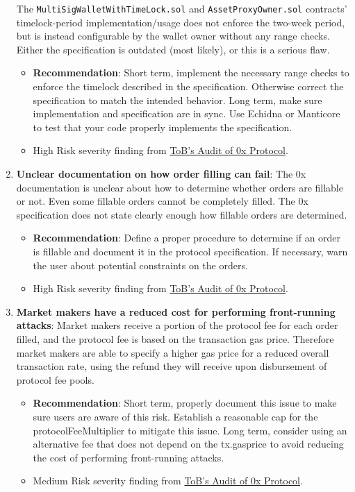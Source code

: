 \begin{enumerate}
The \verb|MultiSigWalletWithTimeLock.sol| and \verb|AssetProxyOwner.sol| contracts' timelock-period implementation/usage does not enforce the two-week period, but is instead configurable by the wallet owner without any range checks. Either the specification is outdated (most likely), or this is a serious flaw.
	\begin{itemize}
	\item\textbf{Recommendation}: Short term, implement the necessary range checks to enforce the timelock described in the specification. Otherwise correct the specification to match the intended behavior. Long term, make sure implementation and specification are in sync. Use Echidna or Manticore to test that your code properly implements the specification.
	\item High Risk severity finding from \href{https://github.com/trailofbits/publications/blob/master/reviews/0x-protocol.pdf}{ToB’s Audit of 0x Protocol}.
	\end{itemize}

\item\textbf{Unclear documentation on how order filling can fail}: The 0x documentation is unclear about how to determine whether orders are fillable or not. Even some fillable orders cannot be completely filled. The 0x specification does not state clearly enough how fillable orders are determined.
	\begin{itemize}
	\item\textbf{Recommendation}: Define a proper procedure to determine if an order is fillable and document it in the protocol specification. If necessary, warn the user about potential constraints on the orders.
	\item High Risk severity finding from \href{https://github.com/trailofbits/publications/blob/master/reviews/0x-protocol.pdf}{ToB’s Audit of 0x Protocol}.
	\end{itemize}

\item\textbf{Market makers have a reduced cost for performing front-running attacks}: Market makers receive a portion of the protocol fee for each order filled, and the protocol fee is based on the transaction gas price. Therefore market makers are able to specify a higher gas price for a reduced overall transaction rate, using the refund they will receive upon disbursement of protocol fee pools.
	\begin{itemize}
	\item\textbf{Recommendation}: Short term, properly document this issue to make sure users are aware of this risk. Establish a reasonable cap for the protocolFeeMultiplier to mitigate this issue. Long term, consider using an alternative fee that does not depend on the tx.gasprice to avoid reducing the cost of performing front-running attacks.
	\item Medium Risk severity finding from \href{https://github.com/trailofbits/publications/blob/master/reviews/0x-protocol.pdf}{ToB’s Audit of 0x Protocol}.
	\end{itemize}


\end{enumerate}
